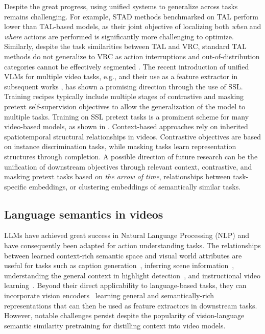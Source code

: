 Despite the great progress, using unified systems to generalize across tasks remains challenging. For example, STAD methods  benchmarked on TAL perform lower than TAL-based models, as their joint objective of localizing both \emph{when} and \emph{where} actions are performed is significantly more challenging to optimize. Similarly, despite the task similarities between TAL and VRC, standard TAL methods do not generalize to VRC as action interruptions and out-of-distribution categories cannot be effectively segmented . The recent introduction of unified VLMs for multiple video tasks, e.g.,  and their use as a feature extractor in subsequent works , has shown a promising direction through the use of SSL. Training recipes typically include multiple stages of contrastive and masking pretext self-supervision objectives to allow the generalization of the model to multiple tasks. Training on SSL pretext tasks is a prominent scheme for many video-based models, as shown in . Context-based approaches rely on inherited spatiotemporal structural relationships in videos. Contrastive objectives are based on instance discrimination tasks, while masking tasks learn representation structures through completion. A possible direction of future research can be the unification of downstream objectives through relevant context, contrastive, and masking pretext tasks based on \emph{the arrow of time}, relationships between task-specific embeddings, or clustering embeddings of semantically similar tasks.     




\subsection{Language semantics in videos}
\label{sec:recognition::language}


LLMs have achieved great success in Natural Language Processing (NLP) and have consequently been adapted for action understanding tasks. The relationships between learned context-rich semantic space and visual world attributes are useful for tasks such as caption generation~, inferring scene information~, understanding the general context in highlight detection~, and instructional video learning~. Beyond their direct applicability to language-based tasks, they can incorporate vision encoders~ learning general and semantically-rich representations that can then be used as feature extractors in downstream tasks. However, notable challenges persist despite the popularity of vision-language semantic similarity pretraining for distilling context into video models. 

